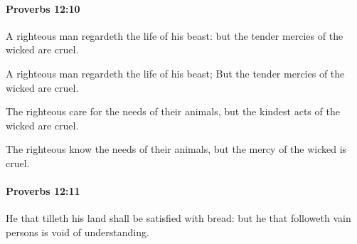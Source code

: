 		\paragraph{Proverbs 12:10} %
			\label{PROVERBS-12-10}

			A righteous man regardeth the life of his beast: but the tender mercies of the wicked are cruel.

			\begin{versebox}
					\item[BHS] 
					\item[ASV] A righteous man regardeth the life of his beast; But the tender mercies of the wicked are cruel.
					\item[NIV] The righteous care for the needs of their animals, but the kindest acts of the wicked are cruel.
					\item[NRSV] The righteous know the needs of their animals, but the mercy of the wicked is cruel.
			\end{versebox}

		\paragraph{Proverbs 12:11} %
			\label{PROVERBS-12-11}

			He that tilleth his land shall be satisfied with bread: but he that followeth vain persons is void of understanding.

